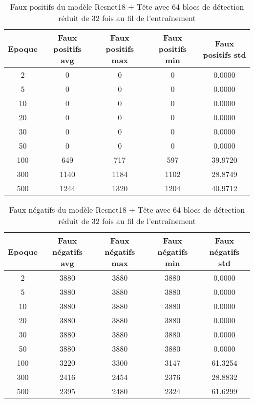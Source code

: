 \begin{table}[!ht]
    \caption{Faux positifs du modèle Resnet18 + Tête avec 64 blocs de détection réduit de 32 fois au fil de l'entraînement}
    \label{tab:resnet18+head_64n_false_positive_reduced_32x_precision}
    \centering
    \begin{tabular}{ |c||c|c|c|c|  }
        \hline
        \rowcolor{gray!50}
        Epoque & Faux positifs avg & Faux positifs max & Faux positifs min & Faux positifs std\\
        \hline
        2 & 0 & 0 & 0 & 0.0000\\
        5 & 0 & 0 & 0 & 0.0000\\
        10 & 0 & 0 & 0 & 0.0000\\
        20 & 0 & 0 & 0 & 0.0000\\
        30 & 0 & 0 & 0 & 0.0000\\
        50 & 0 & 0 & 0 & 0.0000\\
        100 & 649 & 717 & 597 & 39.9720\\
        300 & 1140 & 1184 & 1102 & 28.8749\\
        500 & 1244 & 1320 & 1204 & 40.9712\\
        \hline
    \end{tabular}
\end{table}

\begin{table}[!ht]
    \caption{Faux négatifs du modèle Resnet18 + Tête avec 64 blocs de détection réduit de 32 fois au fil de l'entraînement}
    \label{tab:resnet18+head_64n_false_negative_reduced_32x_precision}
    \centering
    \begin{tabular}{ |c||c|c|c|c|  }
        \hline
        \rowcolor{gray!50}
        Epoque & Faux négatifs avg & Faux négatifs max & Faux négatifs min & Faux négatifs std\\
        \hline
        2 & 3880 & 3880 & 3880 & 0.0000\\
        5 & 3880 & 3880 & 3880 & 0.0000\\
        10 & 3880 & 3880 & 3880 & 0.0000\\
        20 & 3880 & 3880 & 3880 & 0.0000\\
        30 & 3880 & 3880 & 3880 & 0.0000\\
        50 & 3880 & 3880 & 3880 & 0.0000\\
        100 & 3220 & 3300 & 3147 & 61.3254\\
        300 & 2416 & 2454 & 2376 & 28.8832\\
        500 & 2395 & 2480 & 2324 & 61.6299\\
        \hline
    \end{tabular}
\end{table}

